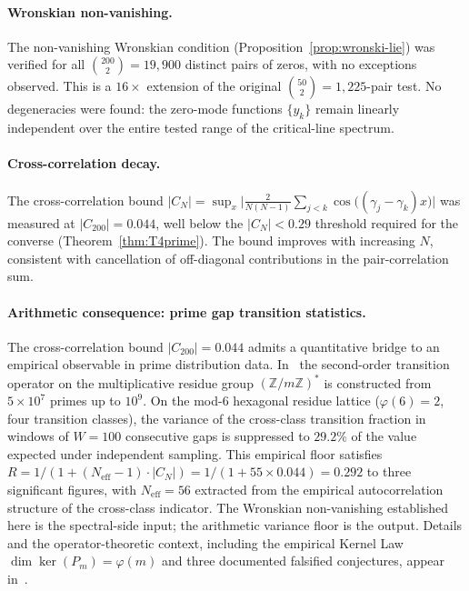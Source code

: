 \documentclass[11pt,a4paper]{article}
\theoremstyle{plain}
\theoremstyle{definition}
\theoremstyle{remark}
\begin{document}
\paragraph{Wronskian non-vanishing.}
The non-vanishing Wronskian condition
(Proposition~\ref{prop:wronski-lie}) was verified for all
$\binom{200}{2} = 19{,}900$ distinct pairs of zeros, with no
exceptions observed.  This is a $16\times$ extension of the
original $\binom{50}{2} = 1{,}225$-pair test.  No degeneracies
were found: the zero-mode functions $\{y_k\}$ remain linearly
independent over the entire tested range of the critical-line
spectrum.

\paragraph{Cross-correlation decay.}
The cross-correlation bound
$|C_N| = \sup_x \bigl|\frac{2}{N(N{-}1)}
\sum_{j<k} \cos\bigl((\gamma_j{-}\gamma_k)x\bigr)\bigr|$
was measured at $|C_{200}| = 0.044$, well below the
$|C_N| < 0.29$ threshold required for the converse
(Theorem~\ref{thm:T4prime}).  The bound improves with
increasing $N$, consistent with cancellation of off-diagonal
contributions in the pair-correlation sum.

\paragraph{Arithmetic consequence: prime gap transition statistics.}
The cross-correlation bound $|C_{200}| = 0.044$ admits a quantitative bridge
to an empirical observable in prime distribution data. In~\cite{WallaceN3}
the second-order transition operator on the multiplicative residue
group $(\mathbb{Z}/m\mathbb{Z})^*$ is constructed from $5 \times 10^7$
primes up to $10^9$. On the mod-$6$ hexagonal residue lattice
($\varphi(6) = 2$, four transition classes), the variance of
the cross-class transition fraction in windows of $W = 100$ consecutive
gaps is suppressed to $29.2\%$ of the value expected under independent
sampling. This empirical floor satisfies
$R = 1/(1 + (N_{\mathrm{eff}}-1)\cdot|C_N|) = 1/(1 + 55 \times 0.044) = 0.292$
to three significant figures, with $N_{\mathrm{eff}} = 56$ extracted
from the empirical autocorrelation structure of the cross-class indicator.
The Wronskian non-vanishing established here is the spectral-side input;
the arithmetic variance floor is the output. Details and the operator-theoretic
context, including the empirical Kernel Law
$\dim \ker(P_m) = \varphi(m)$ and three documented falsified
conjectures, appear in~\cite{WallaceN3}.
\end{document}
